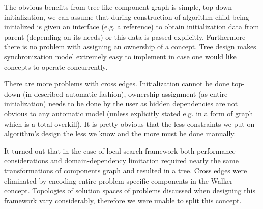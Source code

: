 The obvious benefits from tree-like component graph is simple, top-down
initialization, we can assume that during construction of algorithm child being
initialized is given an interface (e.g. a reference) to obtain initialization
data from parent (depending on its needs) or this data is passed explicitly.
Furthermore there is no problem with assigning an ownership of a concept. Tree
design makes synchronization model extremely easy to implement in case one
would like concepts to operate concurrently.

There are more problems with cross edges. Initialization cannot be done
top-down (in described automatic fashion), ownership assignment (as entire
initialization) needs to be done by the user as hidden dependencies are not
obvious to any automatic model (unless explicitly stated e.g. in a form of
graph which is a total overkill). It is pretty obvious that the less
constraints we put on algorithm's design the less we know and the more must be
done manually.

It turned out that in the case of local search framework both performance
considerations and domain-dependency limitation required nearly the same
transformations of components graph and resulted in a tree. Cross edges were
eliminated by encoding entire problem specific components in the Walker
concept. Topologies of solution spaces of problems discussed when designing
this framework vary considerably, therefore we were unable to split this
concept.

